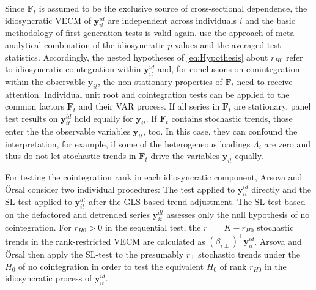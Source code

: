 Since $ \boldsymbol{F}_t $ is assumed to be the exclusive source of cross-sectional dependence, the idiosyncratic VECM of $ \boldsymbol{y}^{i \! d}_{it} $ are independent across individuals $ i $ and the basic methodology of first-generation tests is valid again. \citet{ArsovaOersal2017} use the approach of meta-analytical combination of the idiosyncratic $p$-values and \citet{ArsovaOersal2018} the averaged test statistics. Accordingly, the nested hypotheses of \eqref{eq:Hypothesis} about $ r_{H0} $ refer to idiosyncratic cointegration within $ \boldsymbol{y}^{i \! d}_{it} $ and, for conclusions on conintegration within the observable $ \boldsymbol{y}_{it} $, the non-stationary properties of $ \boldsymbol{F}_t $ need to receive attention. Individual unit root and cointegration tests can be applied to the common factors $ \boldsymbol{F}_t $ and their VAR process. If all series in $ \boldsymbol{F}_t $ are stationary, panel test results on $ \boldsymbol{y}^{i \! d}_{it} $ hold equally for $ \boldsymbol{y}_{it} $. If $ \boldsymbol{F}_t $ contains stochastic trends, those enter the the observable variables $ \boldsymbol{y}_{it} $, too. In this case, they can confound the interpretation, for example, if some of the heterogeneous loadings $ \Lambda_i $ are zero and thus do not let stochastic trends in $ \boldsymbol{F}_t $ drive the variables $ \boldsymbol{y}_{it} $ equally.

For testing the cointegration rank in each idiosyncratic component, Arsova and Örsal \citeyearpar{ArsovaOersal2017,ArsovaOersal2018} consider two individual procedures: The \citeauthor{Johansen1988} test applied to $ \boldsymbol{y}^{i \! d}_{it} $ directly and the SL-test applied to $ \boldsymbol{y}^{d \! t}_{it} $ after the GLS-based trend adjustment. The SL-test based on the defactored and detrended series $ \boldsymbol{y}^{d \! t}_{it} $ assesses only the null hypothesis of no cointegration. For $ r_{H0} > 0 $ in the sequential test, the $ r_\perp = K - r_{H0} $ stochastic trends in the rank-restricted VECM are calculated as $ \left( \beta_{i \perp} \right)^\top \boldsymbol{y}^{i \! d}_{it} $. Arsova and Örsal \citeyearpar{ArsovaOersal2017,ArsovaOersal2018} then apply the SL-test to the presumably $ r_\perp $ stochastic trends under the $ H_0 $ of no cointegration in order to test the equivalent $ H_0 $ of rank $ r_{H0} $ in the idiosyncratic process of $ \boldsymbol{y}^{i \! d}_{it} $. 

